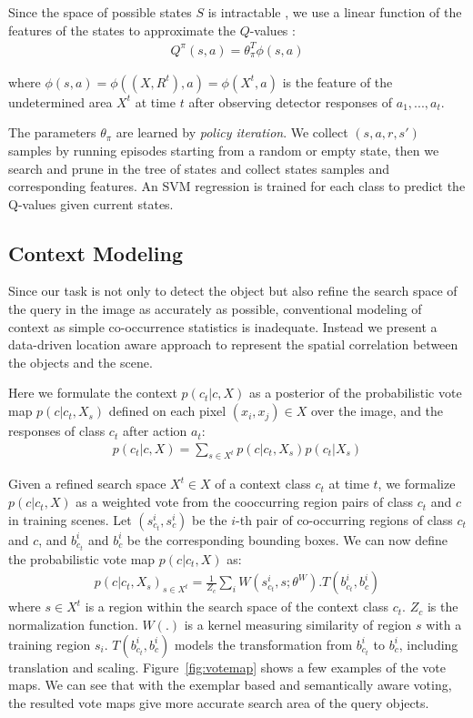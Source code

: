 Since the space of possible states $S$ is intractable , we use a linear function of the features of the states to approximate the $Q$-values :
\begin{eqnarray}
\label{eq:qvalue}
Q^{\pi}(s,a) = \theta_\pi^T \phi(s,a) 
\end{eqnarray}

where $\phi(s,a) = \phi((X, R^t),a) = \phi(X^t,a)$ is the feature of the undetermined area $X^t$ at time $t$ after observing detector responses of $a_1,...,a_t$. 

The parameters $\theta_\pi$ are learned by \textit{policy iteration}. We collect $(s,a,r,s')$ samples by running episodes starting from a random or empty state, then we search and prune in the tree of states and collect states samples  and corresponding features. An SVM regression is trained for each class to predict the Q-values given current states.

\subsection{Context Modeling}
\label{sec:context}
Since our task is not only to detect the object but also refine the search space of the query in the image as accurately as possible, conventional modeling of context as simple co-occurrence statistics is inadequate. Instead we present a data-driven location aware approach to represent the spatial correlation between the objects and the scene. 

Here we formulate the context $p(c_t|c,X)$ as a posterior of the probabilistic vote map $p(c|c_t,X_s)$ defined on each pixel $(x_i,x_j)\in X$ over the image, and the responses of class $c_t$ after action $a_t$:
\begin{eqnarray}
p(c_t|c,X) = \sum_{s\in X^t} p(c|c_t,X_s)p(c_t|X_s)
\end{eqnarray}

Given a refined search space $X^t\in X$ of a context class $c_t$ at time $t$, we formalize $p(c|c_t,X)$ as a weighted vote from the cooccurring region pairs of class $c_t$ and $c$ in training scenes. Let $(s_{c_t}^i, s_c^i)$ be the $i$-th pair of co-occurring regions of class $c_t$ and $c$, and $b_{c_t}^i$ and $b_c^i$ be the corresponding bounding boxes. We can now define the probabilistic vote map $p(c|c_t,X)$ as:
\begin{eqnarray}
\label{eq:votemap}
p(c|c_t,X_s)_{s\in X^t} = \frac{1}{Z_c}\sum_i W(s_{c_t}^i,s;\theta^W).T(b_{c_t}^i,b_c^i)
\end{eqnarray}
where $s\in X^t$ is a region within the search space of the context class $c_t$. $Z_c$ is the normalization function. $W(.)$ is a kernel measuring similarity of region $s$ with a training region $s_i$. $T(b_{c_t}^i,b_c^i)$ models the transformation from $b_{c_t}^i$ to $b_c^i$, including translation and scaling. Figure~\ref{fig:votemap} shows a few examples of the vote maps. We can see that with the exemplar based and semantically aware voting, the resulted vote maps give more accurate search area of the query objects.


